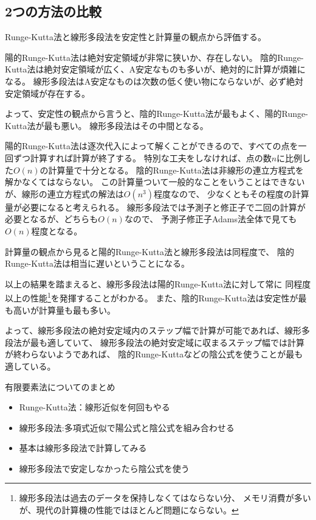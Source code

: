\documentclass[autodetect-engine,dvipdfmx-if-dvi,ja=standard,a4paper,layout=v2]{bxjsreport}
\begin{document}
    \subsection{2つの方法の比較}
    Runge-Kutta法と線形多段法を安定性と計算量の観点から評価する。\par
    陽的Runge-Kutta法は絶対安定領域が非常に狭いか、存在しない。
    陰的Runge-Kutta法は絶対安定領域が広く、A安定なものも多いが、絶対的に計算が煩雑になる。
    線形多段法はA安定なものは次数の低く使い物にならないが、必ず絶対安定領域が存在する。\par
    よって、安定性の観点から言うと、陰的Runge-Kutta法が最もよく、陽的Runge-Kutta法が最も悪い。
    線形多段法はその中間となる。\par
    陽的Runge-Kutta法は逐次代入によって解くことができるので、すべての点を一回ずつ計算すれば計算が終了する。
    特別な工夫をしなければ、点の数$n$に比例した$O(n)$の計算量で十分となる。
    陰的Runge-Kutta法は非線形の連立方程式を解かなくてはならない。
    この計算量ついて一般的なことをいうことはできないが、線形の連立方程式の解法は$O(n^3)$程度なので、
    少なくともその程度の計算量が必要になると考えられる。
    線形多段法では予測子と修正子で二回の計算が必要となるが、どちらも$O(n)$なので、
    予測子修正子Adams法全体で見ても$O(n)$程度となる。\par
    計算量の観点から見ると陽的Runge-Kutta法と線形多段法は同程度で、
    陰的Runge-Kutta法は相当に遅いということになる。\par
    以上の結果を踏まえると、線形多段法は陽的Runge-Kutta法に対して常に
    同程度以上の性能\footnote{
      線形多段法は過去のデータを保持しなくてはならない分、
      メモリ消費が多いが、現代の計算機の性能ではほとんど問題にならない。
    }を発揮することがわかる。
    また、陰的Runge-Kutta法は安定性が最も高いが計算量も最も多い。\par
    よって、線形多段法の絶対安定域内のステップ幅で計算が可能であれば、線形多段法が最も適していて、
    線形多段法の絶対安定域に収まるステップ幅では計算が終わらないようであれば、
    陰的Runge-Kuttaなどの陰公式を使うことが最も適している。
    \begin{itembox}[l]{有限要素法についてのまとめ}
      \begin{itemize}
        \item Runge-Kutta法：線形近似を何回もやる
        \item 線形多段法:多項式近似で陽公式と陰公式を組み合わせる
        \item 基本は線形多段法で計算してみる
        \item 線形多段法で安定しなかったら陰公式を使う
      \end{itemize}
    \end{itembox}
\end{document}
